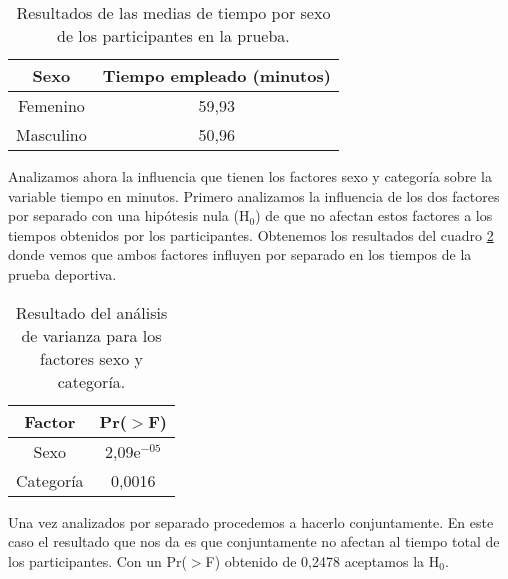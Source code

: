 \documentclass[11pt,a4paper]{article}
\begin{document}
\begin{table}[ht]
\centering
\begin{tabular}{cc}
\toprule[0.4mm]
Sexo & Tiempo empleado (minutos)\\
\midrule
Femenino & 59,93\\
Masculino & 50,96\\
\bottomrule[0.4mm]
\end{tabular}
\caption{Resultados de las medias de tiempo por sexo de los participantes en la prueba.}
\label{tab:sexo}
\end{table}

Analizamos ahora la influencia que tienen los factores sexo y categoría sobre la variable tiempo en minutos. Primero analizamos la influencia de los dos factores por separado con una hipótesis nula (H$_{0}$) de que no afectan estos factores a los tiempos obtenidos por los participantes. Obtenemos los resultados del cuadro \ref{tab:anova1} donde vemos que ambos factores influyen por separado en los tiempos de la prueba deportiva.

\begin{table}[ht]
\centering
\begin{tabular}{cc}
\toprule[0.4mm]
Factor & Pr($>$F)\\
\midrule
Sexo & 2,09e$^{-05}$\\
Categoría & 0,0016\\
\bottomrule[0.4mm]
\end{tabular}
\caption{Resultado del análisis de varianza para los factores sexo y categoría.}
\label{tab:anova1}
\end{table}

Una vez analizados por separado procedemos a hacerlo conjuntamente. En este caso el resultado que nos da es que conjuntamente no afectan al tiempo total de los participantes. Con un Pr($>$F) obtenido de 0,2478 aceptamos la H$_{0}$.
\end{document}
